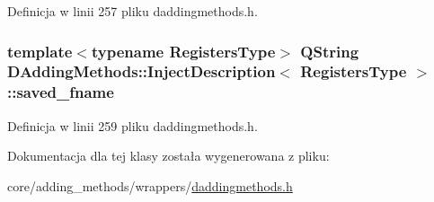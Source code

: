 Definicja w linii 257 pliku daddingmethods.\-h.

\hypertarget{class_d_adding_methods_1_1_inject_description_ab12b0b3cab069790363224252a2a9b22}{
\subsubsection[{saved\-\_\-fname}]{\setlength{\rightskip}{0pt plus 5cm}template$<$typename Registers\-Type$>$ Q\-String {\bf D\-Adding\-Methods\-::\-Inject\-Description}$<$ Registers\-Type $>$\-::saved\-\_\-fname}}\label{class_d_adding_methods_1_1_inject_description_ab12b0b3cab069790363224252a2a9b22}


Definicja w linii 259 pliku daddingmethods.\-h.



Dokumentacja dla tej klasy została wygenerowana z pliku\-:\begin{DoxyCompactItemize}
\item 
core/adding\-\_\-methods/wrappers/\hyperlink{daddingmethods_8h}{daddingmethods.\-h}\end{DoxyCompactItemize}

